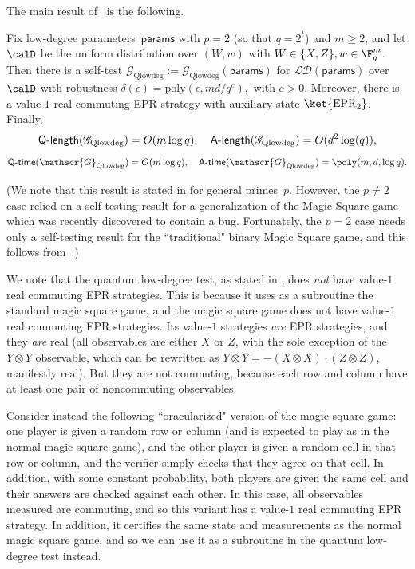 \documentclass[11pt]{article}
\newcommand{\params}{\mathsf{params}}
\newcommand{\game}{\mathscr{G}}
\newcommand{\qtime}[1]{\mathsf{Q}\textnormal{-}\mathsf{time}(#1)}
\newcommand{\atime}[1]{\mathsf{A}\textnormal{-}\mathsf{time}(#1)}
\newcommand{\qlength}[1]{\mathsf{Q}\textnormal{-}\mathsf{length}(#1)}
\newcommand{\alength}[1]{\mathsf{A}\textnormal{-}\mathsf{length}(#1)}
\newcommand{\ainnote}[1]{{\bf \color{blue}(Anand: {#1})}}
\begin{document}
The main result of~\cite{NV18a} is the following.

\begin{theorem}[{\cite[Theorem 3.2]{NV18a}}]\label{thm:anand-thomas-low-degree}
Fix low-degree parameters~$\params$ with $p = 2$ (so that $q = 2^t$) and $m \geq 2$, 
and let $\calD$ be the uniform distribution over $(W, w)$ with $W \in \{X, Z\}, w \in \F_q^m$.
Then there is a self-test $\game_{\mathrm{Qlowdeg}} := \game_{\mathrm{Qlowdeg}}(\params)$
for $\mathcal{LD}(\params)$ over~$\calD$
with robustness
$
\delta(\epsilon) = \mathrm{poly}(\epsilon,md/q^c),
$
with $c > 0$.
Moreover, there is a value-$1$ real commuting EPR strategy with auxiliary state $\ket{\mathrm{EPR}_2}$.
Finally,
\begin{equation*}
\qlength{\game_{\mathrm{Qlowdeg}}} = O(m \log q),
\quad
\alength{\game_{\mathrm{Qlowdeg}}} = O(d^2 \log (q)),
\end{equation*}
\begin{equation*}
\qtime{\game_{\mathrm{Qlowdeg}}} = O(m \log q),
\quad
\atime{\game_{\mathrm{Qlowdeg}}} = \poly(m, d, \log q).
\end{equation*}
\end{theorem}

(We note that this result is stated in \cite{NV18a} for general primes~$p$.
However, the $p \neq 2$ case relied on a self-testing result for a generalization of the Magic Square game
which was recently discovered to contain a bug. 
Fortunately, the $p=2$ case needs only a self-testing result for the
``traditional" binary Magic Square game, and this follows
from~\cite{WBMS16}.)

\begin{remark}
We note that the quantum low-degree test, as stated in \cite{NV18a}, does \emph{not} have value-$1$ real commuting EPR strategies.
This is because it uses as a subroutine the standard magic square game,
and the magic square game does not have value-$1$ real commuting EPR strategies.
Its value-$1$ strategies \emph{are} EPR strategies,
and they \emph{are} real (all observables are either $X$ or $Z$, with the sole exception of the $Y \otimes Y$ observable,
which can be rewritten as $Y \otimes Y = -(X \otimes X) \cdot (Z \otimes Z)$, manifestly real).
But they are not commuting, because each row and column have at least one pair of noncommuting observables.

Consider instead the following ``oracularized" version of the magic square game:
one player is given a random row or column (and is expected to play as in the normal magic square game),
and the other player is given a random cell in that row or column,
and the verifier simply checks that they agree on that cell.
In addition, with some constant probability, both players are given the same cell and their answers are checked against each other.
In this case, all observables measured are commuting, and so this variant has a value-$1$ real commuting EPR strategy.
In addition, it certifies the same state and measurements as the normal magic square game,
and so we can use it as a subroutine in the quantum low-degree test instead.
\end{remark}
\end{document}
